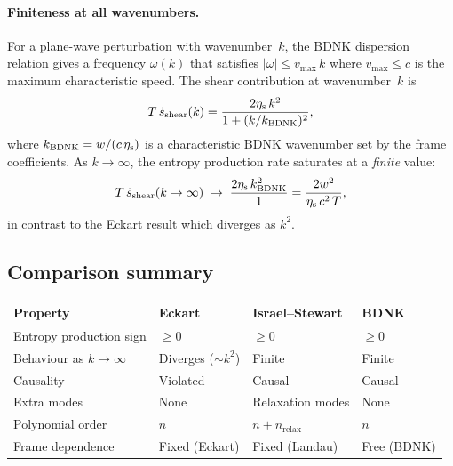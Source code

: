 \paragraph{Finiteness at all wavenumbers.}
For a plane-wave perturbation with wavenumber~$k$, the BDNK
dispersion relation gives a frequency $\omega(k)$ that satisfies
$|\omega| \leqslant v_{\max}\,k$ where $v_{\max} \leqslant c$ is
the maximum characteristic speed.  The shear contribution at
wavenumber~$k$ is
\begin{equation}
\label{eq:bdnk-shear-k}
T\,\dot{s}_{\mathrm{shear}}(k)
= \frac{2\eta_{\mathrm{s}}\,k^2}{1 + (k/k_{\mathrm{BDNK}})^2},
\end{equation}
where $k_{\mathrm{BDNK}} = w/(c\,\eta_{\mathrm{s}})$ is a
characteristic BDNK wavenumber set by the frame coefficients.
As $k\to\infty$, the entropy production rate saturates at a
\emph{finite} value:
\begin{equation}
\label{eq:bdnk-s-limit}
T\,\dot{s}_{\mathrm{shear}}(k\to\infty)
\;\to\; \frac{2\eta_{\mathrm{s}}\,k_{\mathrm{BDNK}}^2}{1}
= \frac{2w^2}{\eta_{\mathrm{s}}\,c^2\,T},
\end{equation}
in contrast to the Eckart result which diverges as $k^2$.

\subsection{Comparison summary}
\label{sec:rel-14-entropy-comparison}

\begin{center}
\renewcommand{\arraystretch}{1.3}
\begin{tabular}{p{4cm}p{3.5cm}p{3.5cm}p{3.5cm}}
\hline
\textbf{Property} & \textbf{Eckart} & \textbf{Israel--Stewart} & \textbf{BDNK} \\
\hline
Entropy production sign
  & $\geqslant 0$ & $\geqslant 0$ & $\geqslant 0$ \\
Behaviour as $k\to\infty$
  & Diverges ($\sim k^2$) & Finite & Finite \\
Causality
  & Violated & Causal & Causal \\
Extra modes
  & None & Relaxation modes & None \\
Polynomial order
  & $n$ & $n + n_{\mathrm{relax}}$ & $n$ \\
Frame dependence
  & Fixed (Eckart) & Fixed (Landau) & Free (BDNK) \\
\hline
\end{tabular}
\end{center}

